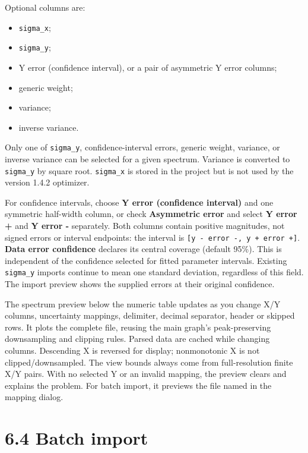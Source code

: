 \documentclass[
  10pt,
  a4paper,
  oneside]{scrreprt}
\providecommand{\tightlist}{%
  \setlength{\itemsep}{0pt}\setlength{\parskip}{0pt}}
\begin{document}
Optional columns are:

\begin{itemize}
\tightlist
\item
  \texttt{sigma\_x};
\item
  \texttt{sigma\_y};
\item
  Y error (confidence interval), or a pair of asymmetric Y error
  columns;
\item
  generic weight;
\item
  variance;
\item
  inverse variance.
\end{itemize}

Only one of \texttt{sigma\_y}, confidence-interval errors, generic
weight, variance, or inverse variance can be selected for a given
spectrum. Variance is converted to \texttt{sigma\_y} by square root.
\texttt{sigma\_x} is stored in the project but is not used by the
version 1.4.2 optimizer.

For confidence intervals, choose \textbf{Y error (confidence interval)}
and one symmetric half-width column, or check \textbf{Asymmetric error}
and select \textbf{Y error +} and \textbf{Y error -} separately. Both
columns contain positive magnitudes, not signed errors or interval
endpoints: the interval is
\texttt{{[}y\ -\ error\ -,\ y\ +\ error\ +{]}}. \textbf{Data error
confidence} declares its central coverage (default 95\%). This is
independent of the confidence selected for fitted parameter intervals.
Existing \texttt{sigma\_y} imports continue to mean one standard
deviation, regardless of this field. The import preview shows the
supplied errors at their original confidence.

The spectrum preview below the numeric table updates as you change X/Y
columns, uncertainty mappings, delimiter, decimal separator, header or
skipped rows. It plots the complete file, reusing the main graph's
peak-preserving downsampling and clipping rules. Parsed data are cached
while changing columns. Descending X is reversed for display;
nonmonotonic X is not clipped/downsampled. The view bounds always come
from full-resolution finite X/Y pairs. With no selected Y or an invalid
mapping, the preview clears and explains the problem. For batch import,
it previews the file named in the mapping dialog.

\hypertarget{batch-import}{%
\section{6.4 Batch import}\label{batch-import}}
\end{document}
